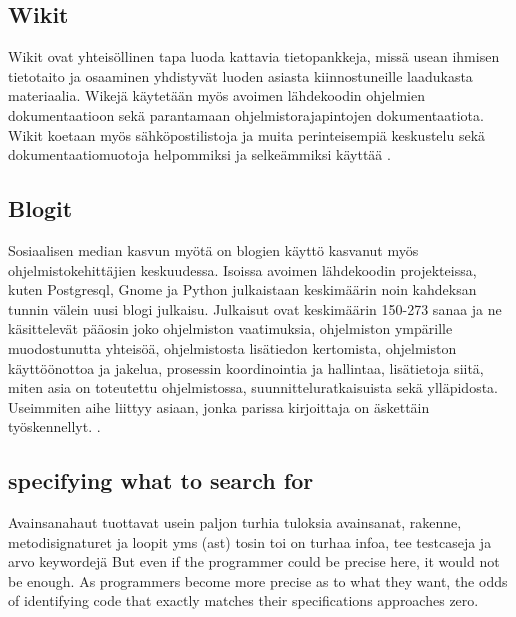 \documentclass[finnish]{../tktltiki2}
\theoremstyle{definition}
\theoremstyle{remark}
\begin{document}
\subsection{Wikit}
Wikit ovat yhteisöllinen tapa luoda kattavia tietopankkeja, missä usean ihmisen tietotaito ja osaaminen yhdistyvät luoden asiasta kiinnostuneille laadukasta materiaalia. Wikejä käytetään myös avoimen lähdekoodin ohjelmien dokumentaatioon sekä parantamaan ohjelmistorajapintojen dokumentaatiota. Wikit koetaan myös sähköpostilistoja ja muita perinteisempiä keskustelu sekä dokumentaatiomuotoja helpommiksi ja selkeämmiksi käyttää \cite{using-wikis-in-sw}.
\subsection{Blogit}
Sosiaalisen median kasvun myötä on blogien käyttö kasvanut myös ohjelmistokehittäjien keskuudessa. Isoissa avoimen lähdekoodin projekteissa, kuten Postgresql, Gnome ja Python julkaistaan keskimäärin noin kahdeksan tunnin välein uusi blogi julkaisu. Julkaisut ovat keskimäärin 150-273 sanaa ja ne käsittelevät pääosin joko ohjelmiston vaatimuksia, ohjelmiston ympärille muodostunutta yhteisöä, ohjelmistosta lisätiedon kertomista, ohjelmiston käyttöönottoa ja jakelua, prosessin koordinointia ja hallintaa, lisätietoja siitä, miten asia on toteutettu ohjelmistossa, suunnitteluratkaisuista sekä ylläpidosta. Useimmiten aihe liittyy asiaan, jonka parissa kirjoittaja on äskettäin työskennellyt. \cite{how-dev-blog}.


\cite{how-dev-blog}
\subsection{specifying what to search for}
Avainsanahaut tuottavat usein paljon turhia tuloksia
avainsanat, rakenne, metodisignaturet ja loopit yms (ast) tosin toi on turhaa infoa, tee testcaseja ja arvo keywordejä
But even if the programmer could be precise here, it would not be enough. As programmers become more precise as to what they want, the odds of identifying code that exactly matches their specifications approaches zero.

\end{document}
